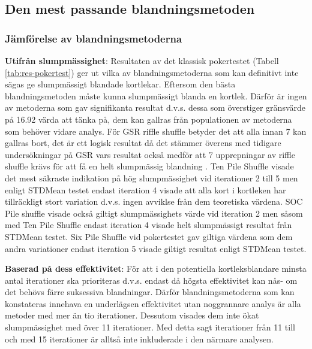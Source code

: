 \documentclass[swedish,a4paper]{article}
\begin{document}
\subsection{Den mest passande blandningsmetoden}
\label{sec:d_bm}

\subsubsection{Jämförelse av blandningsmetoderna}
\label{sec:d_bm_jbm}
\textbf{Utifrån slumpmässighet}: Resultaten av det klassisk pokertestet (Tabell
\ref{tab:res-pokertest}) ger ut vilka av blandningsmetoderna som kan definitivt
inte sägas ge slumpmässigt blandade kortlekar.
Eftersom den bästa blandningsmetoden måste kunna slumpmässigt blanda en kortlek.
Därför är ingen av metoderna som gav signifikanta resultat d.v.s. dessa som
överstiger gränsvärde på 16.92 värda att tänka på, dem kan gallras från
populationen av metoderna som behöver vidare analys. För GSR riffle shuffle
betyder det att alla innan 7 kan gallras bort, det är ett logisk resultat då det
stämmer överens med tidigare undersökningar på GSR vars resultat också medför
att 7 upprepningar av riffle shuffle krävs för att få en helt slumpmässig
blandning \parencite{dovetaillair}. Ten Pile Shuffle visade det mest säkraste
indikation på hög slumpmässighet vid iterationer 2 till 5 men enligt
STDMean testet endast iteration 4 visade att alla kort i kortleken har
tillräckligt stort variation d.v.s. ingen avviklse från dem teoretiska värdena.
SOC Pile shuffle visade också giltigt slumpmässighets värde vid iteration 2 men
såsom med Ten Pile Shuffle endast iteration 4 visade helt slumpmässigt resultat
från STDMean testet. Six Pile Shuffle vid pokertestet gav giltiga värdena som
dem andra variationer endast iteration 5 visade giltigt resultat enligt STDMean
testet.  


\textbf{Baserad på dess effektivitet}: För att i
den potentiella kortleksblandare minsta antal iterationer ska prioriteras d.v.s.
endast då högsta effektivitet kan nås- om det behövs färre suksessiva
blandningar. Därför blandningsmetoderna som kan konstateras innehava en
underlägsen effektivitet utan noggrannare analys är alla metoder med mer än tio
iterationer. Dessutom visades dem inte ökat slumpmässighet med över 11
iterationer. Med detta sagt iterationer från 11 till och med 15 iterationer är
alltså inte inkluderade i den närmare analysen.
\end{document}
